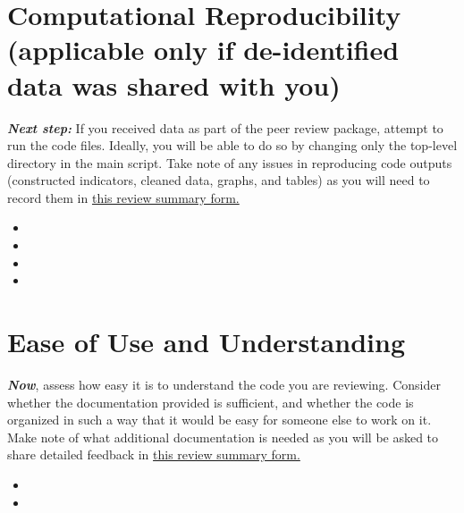 \documentclass{tufte-handout}
\begin{document}
\begin{fullwidth}
        \section*{Computational Reproducibility (applicable only if de-identified data was shared with you)}

        \textit{\textbf{Next step:}} If you received data as part of the peer review package, attempt to run the code files. Ideally, you will be able to do so by changing only the top-level directory in the main script. Take note of any issues in reproducing code outputs (constructed indicators, cleaned data, graphs, and tables) as you will need to record them in \href{https://survey.wb.surveycto.com/collect/code_review_summary?caseid=}{this review summary form.}

        \begin{itemize}
			\setlength\itemsep{-0.1em}
			\item[] 
                \item[] 
			\item[] 
            \item[] 
          		
		\end{itemize}
		
        \vspace{.6em}

       \section*{Ease of Use and Understanding}

       \textit{\textbf{Now}}, assess how easy it is to understand the code you are reviewing. Consider whether the documentation provided is sufficient, and whether the code is organized in such a way that it would be easy for someone else to work on it. Make note of what additional documentation is needed as you will be asked to share detailed feedback in \href{https://survey.wb.surveycto.com/collect/code_review_summary?caseid=}{this review summary form.}

       
        \begin{itemize}
			\setlength\itemsep{-0.1em}
			\item[] 
                \item[] 


\end{itemize}
\end{fullwidth}
\end{document}
